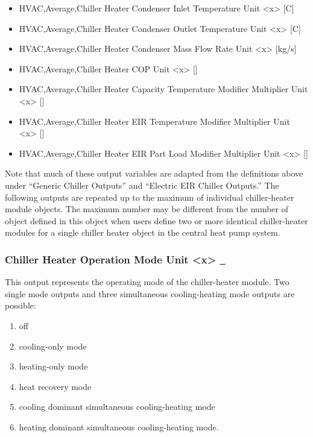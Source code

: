 \begin{itemize}
    \item
    HVAC,Average,Chiller Heater Condenser Inlet Temperature Unit \textless{}x\textgreater{} {[}C{]}
    \item
    HVAC,Average,Chiller Heater Condenser Outlet Temperature Unit \textless{}x\textgreater{} {[}C{]}
    \item
    HVAC,Average,Chiller Heater Condenser Mass Flow Rate Unit \textless{}x\textgreater{} {[}kg/s{]}
    \item
    HVAC,Average,Chiller Heater COP Unit \textless{}x\textgreater{} {[]}
    \item
    HVAC,Average,Chiller Heater Capacity Temperature Modifier Multiplier Unit \textless{}x\textgreater{} {[]}
    \item
    HVAC,Average,Chiller Heater EIR Temperature Modifier Multiplier Unit \textless{}x\textgreater{} {[]}
    \item
    HVAC,Average,Chiller Heater EIR Part Load Modifier Multiplier Unit \textless{}x\textgreater{} {[]}
\end{itemize}

Note that much of these output variables are adapted from the definitions above under ``Generic Chiller Outputs'' and ``Electric EIR Chiller Outputs.'' The following outputs are repeated up to the maximum of individual chiller-heater module objects. The maximum number may be different from the number of object defined in this object when users define two or more identical chiller-heater modules for a single chiller heater object in the central heat pump system.

\subsubsection{Chiller Heater Operation Mode Unit \textless{}x\textgreater{} \protect\hyperlink{section-1}{~}}\label{chiller-heater-operation-mode-unit-x}

This output represents the operating mode of the chiller-heater module. Two single mode outputs and three simultaneous cooling-heating mode outputs are possible:

\begin{enumerate}
    \def\labelenumi{\arabic{enumi}.}
    \setcounter{enumi}{-1}
    \item
    off
    \item
    cooling-only mode
    \item
    heating-only mode
    \item
    heat recovery mode
    \item
    cooling dominant simultaneous cooling-heating mode
    \item
    heating dominant simultaneous cooling-heating mode.
\end{enumerate}

